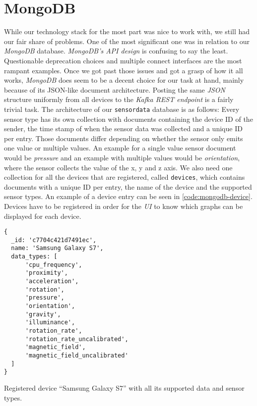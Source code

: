\section{MongoDB}

While our technology stack for the most part was nice to work with, we still had our fair share of
problems. One of the most significant one was in relation to our \textit{MongoDB} database.
\textit{MongoDB’s API design} is confusing to say the least. Questionable deprecation choices and
multiple connect interfaces are the most rampant examples. Once we got past those issues and got a
grasp of how it all works, \textit{MongoDB} does seem to be a decent choice for our task at hand,
mainly because of its JSON-like document architecture. Posting the same \textit{JSON} structure
uniformly from all devices to the \textit{Kafka REST endpoint} is a fairly trivial task. The
architecture of our \texttt{sensordata} database is as follows: Every sensor type has its own
collection with documents containing the device ID of the sender, the time stamp of when the sensor
data was collected and a unique ID per entry. Those documents differ depending on whether the sensor
only emits one value or multiple values. An example for a single value sensor document would be
\textit{pressure} and an example with multiple values would be \textit{orientation}, where the
sensor collects the value of the x, y and z axis. We also need one collection for all the devices
that are registered, called \texttt{devices}, which contains documents with a unique ID per entry,
the name of the device and the supported sensor types. An example of a device entry can be seen in
\autoref{code:mongodb-device}. Devices have to be registered in order for the \textit{UI} to know
which graphs can be displayed for each device.

\begin{code}[H]
  \centering
  \begin{lstlisting}[language=mongo]
{
  _id: 'c7704c421d7491ec',
  name: 'Samsung Galaxy S7',
  data_types: [
      'cpu_frequency',
      'proximity',
      'acceleration',
      'rotation',
      'pressure',
      'orientation',
      'gravity',
      'illuminance',
      'rotation_rate',
      'rotation_rate_uncalibrated',
      'magnetic_field',
      'magnetic_field_uncalibrated'
  ]
}
  \end{lstlisting}
  \caption{Registered device “Samsung Galaxy S7” with all its supported data and sensor types.}
  \label{code:mongodb-device}
\end{code}
